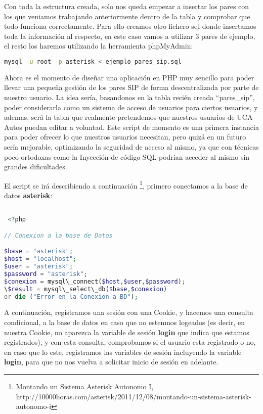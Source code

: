Con toda la estructura creada, solo nos queda empezar a insertar los pares con los que veniamos trabajando anteriormente dentro de la tabla y comprobar que todo funciona correctamente. Para ello creamos otro fichero sql donde insertamos toda la información al respecto, en este caso vamos a utilizar 3 pares de ejemplo, el resto los haremos utilizando la herramienta phpMyAdmin:



\begin{lstlisting}[language=sh]
mysql -u root -p asterisk < ejemplo_pares_sip.sql
\end{lstlisting}

Ahora es el momento de diseñar una aplicación en PHP muy sencillo para poder llevar una pequeña gestión de los pares SIP de forma descentralizada por parte de nuestro usuario. La idea sería, basandonos en la tabla recién creada ``pares\_sip'', poder considerarla como un sistema de acceso de usuarios para ciertos usuarios, y ademas, será la tabla que realmente pretendemos que nuestros usuarios de UCA Autos puedan editar a voluntad. Este script de momento es una primera instancia para poder ofrecer lo que nuestros usuarios necesitan, pero quizá en un futuro sería mejorable, optimizando la seguridad de acceso al mismo, ya que con técnicas poco ortodoxas como la Inyección de código SQL podrían acceder al mismo sin grandes dificultades.

El script se irá describiendo a continuación \footnote{Montando un Sistema Asterisk Autonomo I, \\ http://10000horas.com/asterisk/2011/12/08/montando-un-sistema-asterisk-autonomo-i}, primero conectamos a la base de datos \textbf{asterisk}:

\begin{lstlisting}[language=php,title={./www/usuarios.php}]

 <?php

// Conexion a la base de Datos

$base = "asterisk";
$host = "localhost";
$user = "asterisk";
$password = "asterisk";
$conexion = mysql\_connect($host,$user,$password);
\$result = mysql\_select\_db($base,$conexion) 
or die ("Error en la Conexion a BD");

\end{lstlisting}

A continuación, registramos una sesión con una Cookie, y hacemos una consulta condicional, a la base de datos en caso que no estenmos logeados (es decir, en nuestra Cookie, no aparezca la variable de sesión \textbf{login} que indica que estamos registrados), y con esta consulta, comprobamos si el usuario esta registrado o no, en caso que lo este, registramos las variables de sesión incluyendo la variable \textbf{login}, para que no nos vuelva a solicitar inicio de sesión en adelante.

